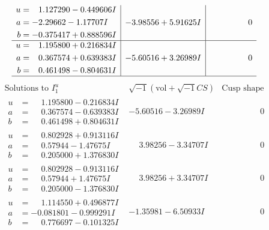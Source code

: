\documentclass[1p]{elsarticle_modified}
\theoremstyle{definition}
\newcommand{\I}{\sqrt{-1}}
\begin{document}
$$\begin{array}{c|c|c}
\begin{aligned}
u &= \phantom{-}1.127290 - 0.449606 I \\
a &= -2.29662 - 1.17707 I \\
b &= -0.375417 + 0.888596 I\end{aligned}
 & -3.98556 + 5.91625 I & \phantom{-0.000000 } 0 \\ \hline\begin{aligned}
u &= \phantom{-}1.195800 + 0.216834 I \\
a &= \phantom{-}0.367574 + 0.639383 I \\
b &= \phantom{-}0.461498 - 0.804631 I\end{aligned}
 & -5.60516 + 3.26989 I & \phantom{-0.000000 } 0\\
 \hline 
 \end{array}$$\newpage$$\begin{array}{c|c|c}  
\text{Solutions to }I^u_{1}& \I (\text{vol} + \sqrt{-1}CS) & \text{Cusp shape}\\
 \hline 
\begin{aligned}
u &= \phantom{-}1.195800 - 0.216834 I \\
a &= \phantom{-}0.367574 - 0.639383 I \\
b &= \phantom{-}0.461498 + 0.804631 I\end{aligned}
 & -5.60516 - 3.26989 I & \phantom{-0.000000 } 0 \\ \hline\begin{aligned}
u &= \phantom{-}0.802928 + 0.913116 I \\
a &= \phantom{-}0.57944 - 1.47675 I \\
b &= \phantom{-}0.205000 + 1.376830 I\end{aligned}
 & \phantom{-}3.98256 - 3.34707 I & \phantom{-0.000000 } 0 \\ \hline\begin{aligned}
u &= \phantom{-}0.802928 - 0.913116 I \\
a &= \phantom{-}0.57944 + 1.47675 I \\
b &= \phantom{-}0.205000 - 1.376830 I\end{aligned}
 & \phantom{-}3.98256 + 3.34707 I & \phantom{-0.000000 } 0 \\ \hline\begin{aligned}
u &= \phantom{-}1.114550 + 0.496877 I \\
a &= -0.081801 - 0.999291 I \\
b &= \phantom{-}0.776697 - 0.101325 I\end{aligned}
 & -1.35981 - 6.50933 I & \phantom{-0.000000 } 0 \\ \hline\begin{aligned}

\end{aligned}
\end{array}$$
\end{document}
